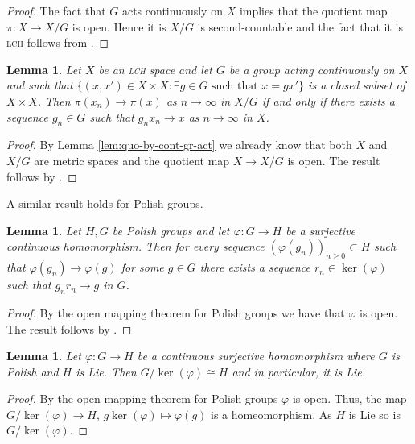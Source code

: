 \documentclass[a4paper,12pt,reqno]{amsart}
\newtheorem{lemma}[theorem]{Lemma}
\theoremstyle{definition}
\def\to{\rightarrow}
\begin{document}
\begin{proof}
The fact that $G$ acts continuously on $X$ implies that the quotient map $\pi:X\to X/G$ is open. Hence it is $X/G$ is second-countable and the fact that it is \textsc{lch} follows from \cite[\S 8.3, Proposition 8 and \S 10.4 Proposition 10]{BourbakiGT1}.
\end{proof}

\begin{lemma}\label{lem:conv-quot}
Let $X$ be an \textsc{lch} space and let $G$ be a group acting continuously on $X$ and such that $\{(x,x')\in X\times X:\exists g\in G \text{ such that }x=gx'\}$ is a closed subset of $X\times X$. Then $\pi(x_n)\to \pi(x)$ as $n\to\infty$ in $X/G$ if and only if there exists a sequence $g_n\in G$ such that $g_nx_n\to x$ as $n\to\infty$ in $X$.
\end{lemma}

\begin{proof}
By Lemma \ref{lem:quo-by-cont-gr-act} we already know that both $X$ and $X/G$ are metric spaces and the quotient map $X\to X/G$ is open. The result follows by \cite[Proposition 2.4]{Si}.
\end{proof}

A similar result holds for Polish groups.

\begin{lemma}\label{lem:conv-polish-group}
Let $H,G$ be Polish groups and let $\varphi:G\to H$ be a surjective continuous homomorphism. Then for every sequence $(\varphi(g_n))_{n\ge 0}\subset H$ such that $\varphi(g_n)\to \varphi(g)$ for some $g\in G$ there exists a sequence $r_n\in \ker(\varphi)$ such that $g_n r_n\to g$ in $G$.
\end{lemma}

\begin{proof}
By the open mapping theorem for Polish groups \cite[Theorem A.1]{HK-non-conv} we have that $\varphi$ is open. The result follows by \cite[Proposition 2.4]{Si}.
\end{proof}

\begin{lemma}\label{lem:quot-polish-gr-lie-gr}
Let $\varphi:G\to H$ be a continuous surjective homomorphism where $G$ is Polish and $H$ is Lie. Then $G/\ker(\varphi)\cong H$ and in particular, it is Lie.
\end{lemma}

\begin{proof}
By the open mapping theorem for Polish groups $\varphi$ is open. Thus, the map $G/\ker(\varphi)\to H$, $g\ker(\varphi)\mapsto \varphi(g)$ is a homeomorphism. As $H$ is Lie so is $G/\ker(\varphi)$.
\end{proof}
\end{document}
